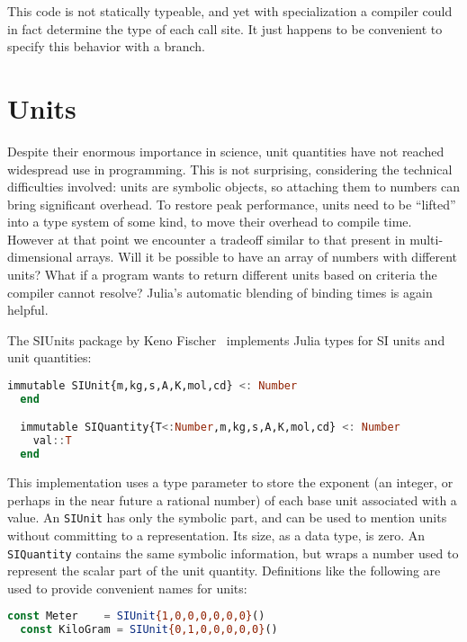 This code is not statically typeable, and yet with specialization a
compiler could in fact determine the type of each call site.
It just happens to be convenient to specify this behavior with a
branch.
\fi

\section{Units}

Despite their enormous importance in science, unit quantities have
not reached widespread use in programming.
This is not surprising, considering the technical difficulties involved:
units are symbolic objects, so attaching them to numbers can bring
significant overhead.
To restore peak performance, units need to be ``lifted'' into a type
system of some kind, to move their overhead to compile time.
However at that point we encounter a tradeoff similar to that present
in multi-dimensional arrays.
Will it be possible to have an array of numbers with different units?
What if a program wants to return different units based on criteria
the compiler cannot resolve?
Julia's automatic blending of binding times is again helpful.

The SIUnits package by Keno Fischer~\cite{Fischer:2014si} implements
Julia types for SI units and unit quantities:

\begin{singlespace}
\begin{lstlisting}[language=julia]
  immutable SIUnit{m,kg,s,A,K,mol,cd} <: Number
  end

  immutable SIQuantity{T<:Number,m,kg,s,A,K,mol,cd} <: Number
    val::T
  end
\end{lstlisting}
\end{singlespace}

\noindent
This implementation uses a type parameter to store the exponent (an integer,
or perhaps in the near future a rational number) of each base unit associated
with a value.
An \texttt{SIUnit} has only the symbolic part, and can be used to mention
units without committing to a representation.
Its size, as a data type, is zero.
An \texttt{SIQuantity} contains the same symbolic information, but wraps a
number used to represent the scalar part of the unit quantity.
Definitions like the following are used to provide convenient names for units:

\begin{singlespace}
\begin{lstlisting}[language=julia]
  const Meter    = SIUnit{1,0,0,0,0,0,0}()
  const KiloGram = SIUnit{0,1,0,0,0,0,0}()
\end{lstlisting}
\end{singlespace}


